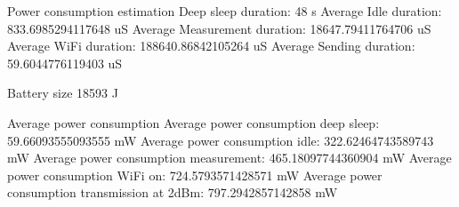 Power consumption estimation
Deep sleep duration: 48 s
Average Idle duration: 833.6985294117648 uS
Average Measurement duration: 18647.79411764706 uS
Average WiFi duration: 188640.86842105264 uS
Average Sending duration: 59.6044776119403 uS

Battery size
18593 J

Average power consumption 
Average power consumption deep sleep:  59.66093555093555 mW
Average power consumption idle:  322.62464743589743 mW
Average power consumption measurement:  465.18097744360904 mW
Average power consumption WiFi on:  724.5793571428571 mW
Average power consumption transmission at 2dBm:  797.2942857142858 mW
